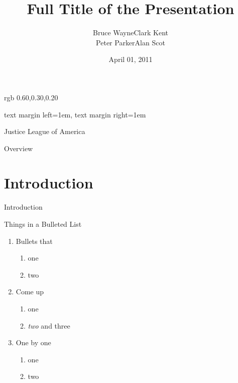 \usepackage[english] {babel}
\usepackage[T1]      {fontenc}

\usepackage{amsmath, amsfonts, graphicx}
\usepackage{bibunits, tikz}

\definecolor{pb@core}        {rgb} {0.60,0.30,0.20}

\setbeamersize
  {text margin left=1em, text margin right=1em}

\title
  [Short Title]
  {Full Title of the Presentation}

\author
  [Bruce Wayne]
  {Bruce Wayne\quad Clark Kent\\Peter Parker\quad Alan Scot}

\date
  {April 01, 2011}

\institute
  {Justice League of America}



\maketitle

\begin{frame}{Overview}

  \tableofcontents

\end{frame}

\section
  {Introduction}

\begin{frame}
  {Introduction}

  Things in a Bulleted List\pause

  \begin{enumerate}
  \item Bullets that
    \begin{enumerate}
    \item one
    \item two
    \end{enumerate}\pause
  \item Come up
    \begin{enumerate}
    \item one
    \item \emph{two} and three
    \end{enumerate}\pause
  \item One by one
    \begin{enumerate}
    \item one
    \item two
    \end{enumerate}
  \end{enumerate}
\end{frame}


